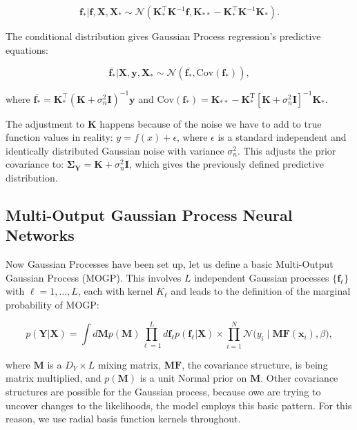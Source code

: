 \[
\boldsymbol{f_*} |\boldsymbol{f},\mathbf{X},\mathbf{X_*} \sim \mathcal{N}(\mathbf{K}_*^\top\mathbf{K}^{-1}\boldsymbol{f}, \mathbf{K}_{**} - \mathbf{K}_*^\top\mathbf{K}^{-1}\mathbf{K}_*).
\]

\noindent The conditional distribution gives Gaussian Process regression's predictive equations:

\[
\bar{\boldsymbol{f_*}}|\mathbf{X},\mathbf{y},\mathbf{X}_* \sim \mathcal{N}(\bar{\boldsymbol{f_*}}, \text{Cov}(\boldsymbol{f}_*)),
\]

\noindent where $\bar{\boldsymbol{f_*}} = \mathbf{K}_*^\top (\mathbf{K}+\sigma_n^2 \mathbf{I})^{-1} \mathbf{y}$ and $\text{Cov}(\boldsymbol{f}_*) = \mathbf{K}_{**}-\mathbf{K}_*^\text{T}[\mathbf{K} + \sigma_n^2\mathbf{I}]^{-1}\mathbf{K}_*$.\cite{10360364}

\noindent The adjustment to $\mathbf{K}$ happens because of the noise we have to add to true function values in reality: $y = f(x) + \epsilon$, where $\epsilon$ is a standard independent and identically distributed Gaussian noise with variance $\sigma_n^2$.\cite{10360364} This adjusts the prior covariance to: $\mathbf{\Sigma_Y} = \mathbf{K} + \sigma_n^2\mathbf{I}$, which gives the previously defined predictive distribution.

\subsection{Multi-Output Gaussian Process Neural Networks}
Now Gaussian Processes have been set up, let us define a basic Multi-Output Gaussian Process (MOGP). This involves $L$ independent Gaussian processes $\{\boldsymbol{f}_{\ell}\}$ with $\ell = 1,\dots, L$, each with kernel $K_\ell$ and leads to the definition of the marginal probability of MOGP:\cite{blundell2015weight} 

\begin{equation}
    p(\mathbf{Y} | \mathbf{X}) = \int d\mathbf{M} p(\mathbf{M}) 
\prod_{\ell=1}^{L} d\boldsymbol{f}_\ell p(\boldsymbol{f}_\ell | \mathbf{X}) \times
\prod_{i=1}^{N} \mathcal{N} \big(y_i \mid \mathbf{M} \mathbf{F} (\mathbf{x}_i), \beta \big),
\label{MOGP}
\end{equation}


where $\mathbf{M}$ is a $D_Y \times L$ mixing matrix, $\mathbf{M}\mathbf{F}$, the covariance structure, is being matrix multiplied, and $p(\mathbf{M})$ is a unit Normal prior on $\mathbf{M}$.\cite{jankowiak2019neural}
Other covariance structures are possible for the Gaussian process, because owe are trying to uncover changes to the likelihoods, the model employs this basic pattern. For this reason, we use radial basis function kernels throughout.\cite{jankowiak2019neural}


